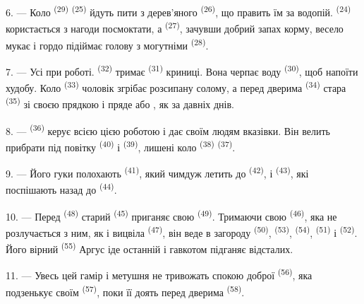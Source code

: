 6. --- Коло  \textsuperscript{(29)} 
\textsuperscript{(25)} йдуть пити з дерев'яного 
\textsuperscript{(26)}, що править їм за водопій. 
\textsuperscript{(24)} користається з нагоди посмоктати, а 
\textsuperscript{(27)}, зачувши добрий запах корму, весело мукає і гордо
підіймає голову з могутніми  \textsuperscript{(28)}.

7. --- Усі при роботі.  \textsuperscript{(32)} тримає
 \textsuperscript{(31)} криниці. Вона черпає воду 
\textsuperscript{(30)}, щоб напоїти худобу. Коло 
\textsuperscript{(33)} чоловік згрібає розсипану солому, а перед дверима
 \textsuperscript{(34)} стара  \textsuperscript{(35)}
зі своєю прядкою і  пряде  або , як
за давніх днів.

\VUsaut{3.0mm}
\VUsaut{3.0mm}

8. ---  \textsuperscript{(36)} керує всією цією роботою і дає
своїм людям вказівки. Він велить прибрати під повітку 
\textsuperscript{(40)} і  \textsuperscript{(39)}, лишені коло
 \textsuperscript{(38)}  \textsuperscript{(37)}.

9. --- Його гуки полохають  \textsuperscript{(41)}, який чимдуж
летить до  \textsuperscript{(42)}, і 
\textsuperscript{(43)}, які поспішають назад до 
\textsuperscript{(44)}.

10. --- Перед  \textsuperscript{(48)} старий 
\textsuperscript{(45)} приганяє свою  \textsuperscript{(49)}.
Тримаючи свою  \textsuperscript{(46)}, яка не розлучається з ним,
як і вицвіла  \textsuperscript{(47)}, він веде в загороду
 \textsuperscript{(50)},  \textsuperscript{(53)},
 \textsuperscript{(54)},  \textsuperscript{(51)} і
 \textsuperscript{(52)}. Його вірний 
\textsuperscript{(55)} Аргус іде останній і гавкотом підганяє відсталих.

11. --- Увесь цей гамір і метушня не тривожать спокою доброї  \textsuperscript{(56)}, яка подзенькує своїм 
\textsuperscript{(57)}, поки її доять перед дверима 
\textsuperscript{(58)}.

